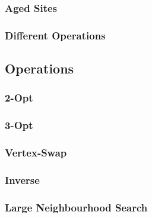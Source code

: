 \subsubsection{Aged Sites}

\subsubsection{Different Operations}

\subsection{Operations}

\subsubsection{2-Opt}

\subsubsection{3-Opt}

\subsubsection{Vertex-Swap}

\subsubsection{Inverse}

\subsubsection{Large Neighbourhood Search}

    


